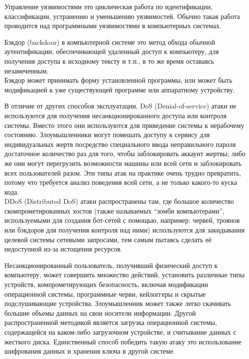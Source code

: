 Управление уязвимостями это циклическая работа по идентификации, классификации, устранению и уменьшению уязвимостей. Обычно такая работа проводится над программными уязвимостями в компьютерных системах. \\


Бэкдор (backdoor) в компьютерной системе это метод обхода обычной аутентификации, обеспечивающей удаленный доступ к компьютеру, для получения доступа к исходному тексту и т.п., в то же время оставаясь незамеченным. \\

Бэкдор может принимать форму установленной программы, или может быть модификацией к уже существующей программе или аппаратному устройству. \\


В отличие от других способов эксплуатации, DoS (Denial-of-service) атаки не используются для получения несанкционированного доступа или контроля системы. Вместо этого они используются для приведение системы к нерабочему состоянию. Злоумышленники могут помешать доступу к сервису для индивидуальных жертв посредство специального ввода неправильного пароля достаточное количество раз для того, чтобы заблокировать аккаунт жертвы; либо же они могут перегрузить возможности машины или всей сети и заблокировать всех пользователей разом. Эти типы атак на практике очень трудно превратить, потому что требуется анализ поведения всей сети, а не только какого-то куска кода. \\

DDoS (Distributed DoS) атаки распространены там, где большое количество скомпрометированных хостов (также называемых ``зомби компьютерами'', используемыми для создания бот-сетей с помощью, например: червей, троянов или бэкдоров для получения контроля над ними) используются для закидывания целевой системы сетевыми запросами, тем самым пытаясь сделать её недоступной из-за истощения ресурсов. \\


Несанкционированный пользователь, получивший физический доступ к компьютеру, может совершить множество действий, установить различные типы устройств, компрометирующих безопасность, включая модификации операционной системы, программные черви, кейлоггеры и скрытые подслушивающие устройства. Злоумышленник может также легко скачивать большие объемы данных на свои носители информации. Другой распространенной методикой является загрузка операционной системы, содержащейся на каком-либо загрузочном устройстве, и считывание данных с жесткого диска. Единственный способ победить такую атаку это использование шифрования данных и хранения ключа в другой системе. \\

